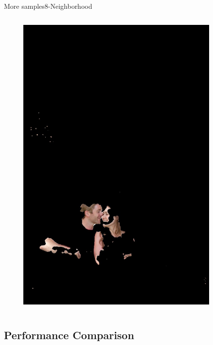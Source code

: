 \documentclass{beamer}
\begin{document}
\begin{frame}{More samples}{8-Neighborhood}
\begin{columns}
\begin{column}{3cm}
\begin{figure}
		\includegraphics[width=0.9\textwidth]{label2500} 
		\end{figure}
\end{column}
\end{columns}
\end{frame}

\subsection{Performance Comparison}
\end{document}
